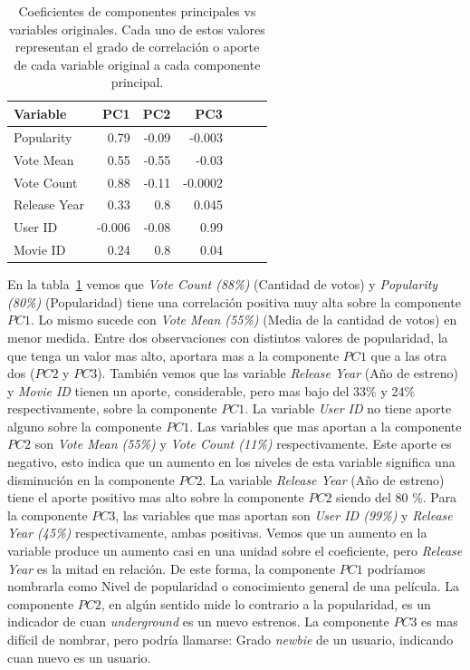 \documentclass[11pt,a4paper,twoside]{thesis}
\begin{document}
\begin{table}[h!]
	\centering
	\begin{tabular}{lrrrrrr}
		\toprule Variable   & PC1    & PC2   & PC3     \\
		\midrule Popularity & 0.79   & -0.09 & -0.003  \\
		Vote Mean           & 0.55   & -0.55 & -0.03   \\
		Vote Count          & 0.88   & -0.11 & -0.0002 \\
		Release Year        & 0.33   & 0.8   & 0.045   \\
		User ID             & -0.006 & -0.08 & 0.99    \\
		Movie ID            & 0.24   & 0.8   & 0.04    \\
		\bottomrule
	\end{tabular}

	\caption{
		Coeficientes de componentes principales vs variables
		originales. Cada uno de estos valores representan el grado
		de correlación o aporte de cada variable original a
		cada componente principal.
	}
	\label{fig:loadingsTable}
\end{table}

En la tabla~\ref{fig:loadingsTable} vemos que \textit{Vote Count (88\%)}
(Cantidad de votos) y \textit{Popularity (80\%)} (Popularidad) tiene una
correlación positiva muy alta sobre la componente $PC1$. Lo mismo sucede con
\textit{Vote Mean (55\%)} (Media de la cantidad de votos) en menor medida.
Entre dos observaciones con distintos valores de popularidad, la que tenga un
valor mas alto, aportara mas a la componente $PC1$ que a las otra dos ($PC2$ y
$PC3$). También vemos que las variable \textit{Release Year} (Año de estreno) y
\textit{Movie ID} tienen un aporte, considerable, pero mas bajo del 33\% y 24\%
respectivamente, sobre la componente $PC1$. La variable \textit{User ID} no
tiene aporte alguno sobre la componente $PC1$. Las variables que mas aportan a
la componente $PC2$ son \textit{Vote Mean (55\%)} y \textit{Vote Count (11\%)}
respectivamente. Este aporte es negativo, esto indica que un aumento en los
niveles de esta variable significa una disminución en la componente $PC2$. La
variable \textit{Release Year} (Año de estreno) tiene el aporte positivo mas
alto sobre la componente $PC2$ siendo del 80 \%. Para la componente $PC3$, las
variables que mas aportan son \textit{User ID (99\%)} y \textit{Release Year
	(45\%)} respectivamente, ambas positivas. Vemos que un aumento en la variable
 produce un aumento casi en una unidad sobre el coeficiente, pero
\textit{Release Year} es la mitad en relación. De este forma, la componente
$PC1$ podríamos nombrarla como Nivel de popularidad o conocimiento general de
una película. La componente $PC2$, en algún sentido mide lo contrario a la
popularidad, es un indicador de cuan \textit{underground} es un nuevo estrenos.
La componente $PC3$ es mas difícil de nombrar, pero podría llamarse: Grado
\textit{newbie} de un usuario, indicando cuan nuevo es un usuario.
\end{document}
